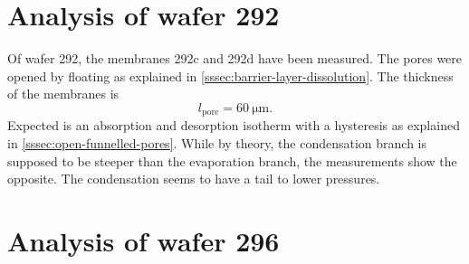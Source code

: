 \documentclass[thesis.tex]{subfiles}
\begin{document}
    \section{Analysis of wafer 292}
    \label{sec:wafer292}

        Of wafer 292, the membranes 292c and 292d have been measured. The pores were opened by floating as explained in \cref{sssec:barrier-layer-dissolution}. The thickness of the membranes is
        \begin{equation}
            l_\mathrm{pore}=\SI{60}{\micro\meter}.
        \end{equation}
        Expected is an absorption and desorption isotherm with a hysteresis as explained in \cref{sssec:open-funnelled-pores}.
        While by theory, the condensation branch is supposed to be steeper than the evaporation branch, the measurements show the opposite.
        The condensation seems to have a tail to lower pressures.


    \section{Analysis of wafer 296}
    \label{sec:wafer296}
\end{document}
